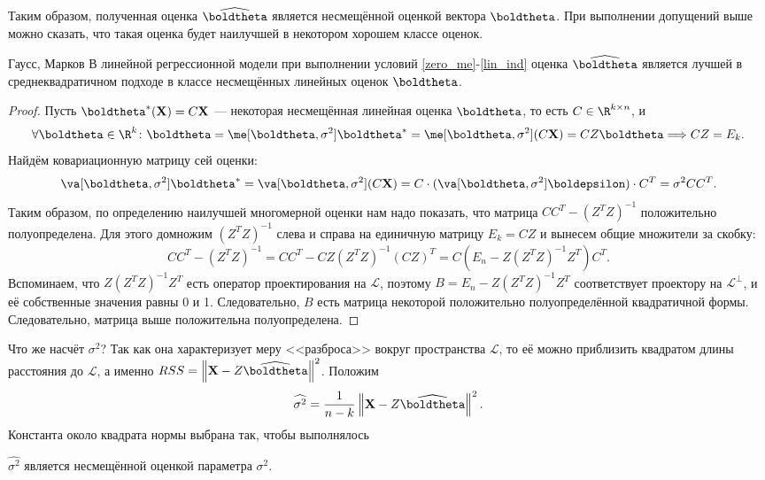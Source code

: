 Таким образом, полученная оценка $\widehat{\boldtheta}$ является несмещённой оценкой вектора $\boldtheta$. При выполнении допущений выше можно сказать, что такая оценка будет наилучшей в некотором хорошем классе оценок.

\begin{theorem}{Гаусс, Марков}{}
    В линейной регрессионной модели при выполнении условий \ref{zero_me}-\ref{lin_ind} оценка $\widehat{\boldtheta}$ является лучшей в среднеквадратичном подходе в классе несмещённых линейных оценок $\boldtheta$.
\end{theorem}

\begin{proof}
    Пусть $\boldtheta^*(\mathbf X) = C\mathbf X$ --- некоторая несмещённая линейная оценка $\boldtheta$, то есть $C \in \R^{k \times n}$, и 
    \[
    \forall \boldtheta \in \R^{k}\colon \boldtheta = \me[\boldtheta, \sigma^2] \boldtheta^* = \me[\boldtheta, \sigma^2] (C\mathbf X) = CZ\boldtheta \Longrightarrow CZ = E_k.
    \]
    Найдём ковариационную матрицу сей оценки:
    \[
    \va[\boldtheta, \sigma^2] \boldtheta^* = \va[\boldtheta, \sigma^2](C\mathbf X) = C\cdot (\va[\boldtheta, \sigma^2] \boldepsilon)\cdot C^T = \sigma^2 CC^T.
    \]
    Таким образом, по определению наилучшей многомерной оценки нам надо показать, что матрица $CC^T - (Z^TZ)^{-1}$ положительно полуопределена. Для этого домножим $(Z^TZ)^{-1}$ слева и справа на единичную матрицу $E_k = CZ$ и вынесем общие множители за скобку:
    \[
    CC^T - (Z^TZ)^{-1} = CC^T - CZ(Z^TZ)^{-1}(CZ)^T = C\left(E_n - Z(Z^TZ)^{-1}Z^T\right)C^T.
    \]
    Вспоминаем, что $Z(Z^TZ)^{-1}Z^T$ есть оператор проектирования на $\mathcal{L}$, поэтому $B = E_n - Z(Z^TZ)^{-1}Z^T$ соответствует проектору на $\mathcal{L}^{\bot}$, и её собственные значения равны 0 и 1. Следовательно, $B$ есть матрица некоторой положительно полуопределённой квадратичной формы. Следовательно, матрица выше положительна полуопределена.
\end{proof}

Что же насчёт $\sigma^2$? Так как она характеризует меру <<разброса>> вокруг пространства $\mathcal{L}$, то её можно приблизить квадратом длины расстояния до $\mathcal{L}$, а именно $RSS = \left\|\mathbf X - Z\widehat \boldtheta\right\|^2$. Положим
\[
\widehat{\sigma^2} = \frac{1}{n - k} \left\|\mathbf X - Z\widehat \boldtheta\right\|^2.
\]
Константа около квадрата нормы выбрана так, чтобы выполнялось
\begin{proposition}
    $\widehat{\sigma^2}$ является несмещённой оценкой параметра $\sigma^2$.
\end{proposition}

